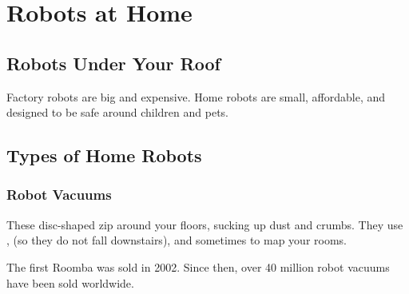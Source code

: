 
\chapter{Robots at Home}


\section*{Robots Under Your Roof}

Factory robots are big and expensive. Home robots are small, affordable,
and designed to be safe around children and pets.


\sectionrule

\section*{Types of Home Robots}

\subsection*{Robot Vacuums}

These disc-shaped  zip around your floors, sucking up dust and crumbs.
They use ,  (so they do not fall downstairs),
and sometimes  to map your rooms.

\begin{funfact}
  The first Roomba was sold in 2002. Since then, over 40 million
  robot vacuums have been sold worldwide.
\end{funfact}

\subsection*{}

